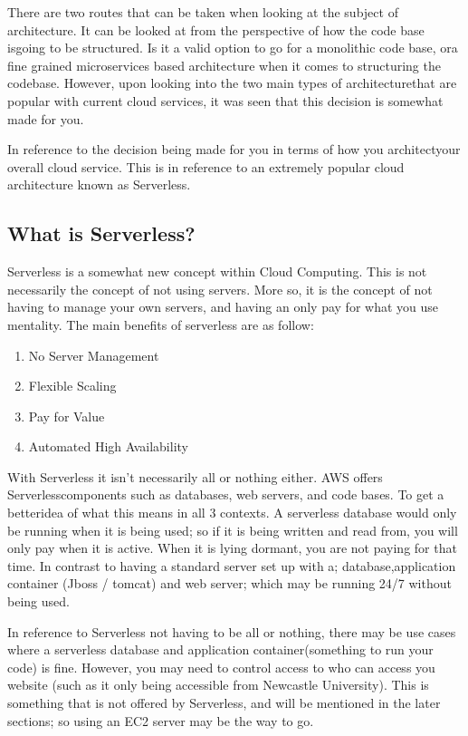\documentclass[runningheads]{llncs}
\begin{document}
There are two routes that can be taken when looking at the subject of architecture. It can be looked at from the perspective of how the code base isgoing to be structured. Is it a valid option to go for a monolithic code base, ora fine grained microservices based architecture when it comes to structuring the codebase. However, upon looking into the two main types of architecturethat are popular with current cloud services, it was seen that this decision is somewhat made for you.

In reference to the decision being made for you in terms of how you architectyour overall cloud service. This is in reference to an extremely popular cloud architecture known as Serverless.

\subsection{What is Serverless?}
Serverless is a somewhat new concept within Cloud Computing. This is not necessarily the concept of not using servers. More so, it is the concept of not having to manage your own servers, and having an only pay for what you use mentality. The main benefits of serverless are as follow:
\begin{enumerate}
	\item No Server Management
	\item Flexible Scaling
	\item Pay for Value
	\item Automated High Availability
\end{enumerate}

With Serverless it isn't necessarily all or nothing either. AWS offers Serverlesscomponents such as databases, web servers, and code bases. To get a betteridea of what this means in all 3 contexts. A serverless database would only be running when it is being used; so if it is being written and read from, you will only pay when it is active. When it is lying dormant, you are not paying for that time. In contrast to having a standard server set up with a; database,application container (Jboss / tomcat) and web server; which may be running 24/7 without being used.

In reference to Serverless not having to be all or nothing, there may be use cases where a serverless database and application container(something to run your code) is fine. However, you may need to control access to who can access you website (such as it only being accessible from Newcastle University). This is something that is not offered by Serverless, and will be mentioned in the later sections; so using an EC2 server may be the way to go.
\end{document}
